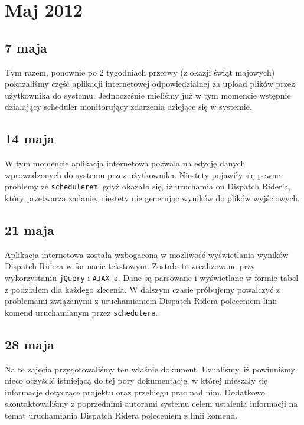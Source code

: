 \section{Maj 2012}
\subsection{7 maja}
Tym razem, ponownie po 2 tygodniach przerwy (z okazji świąt majowych) pokazaliśmy część aplikacji internetowej odpowiedzialnej za 
upload plików przez użytkownika do systemu. Jednocześnie mieliśmy już w tym momencie wstępnie działający scheduler monitorujący
zdarzenia dziejące się w systemie.

\subsection{14 maja}
W tym momencie aplikacja internetowa pozwala na edycję danych wprowadzonych do systemu przez użytkownika.
Niestety pojawiły się pewne problemy ze \texttt{schedulerem}, gdyż okazało się, iż uruchamia on
Dispatch Rider'a, który przetwarza zadanie, niestety nie generując wyników do plików wyjściowych.

\subsection{21 maja}
Aplikacja internetowa została wzbogacona w możliwość wyświetlania wyników Dispatch Ridera w formacie tekstowym.
Zostało to zrealizowane przy wykorzystaniu \texttt{jQuery} i  \texttt{AJAX-a}. Dane są parsowane i wyświetlane w formie tabel
z podziałem dla każdego zlecenia. W dalszym czasie próbujemy powalczyć z problemami związanymi z uruchamianiem Dispatch Ridera
poleceniem linii komend uruchamianym przez \texttt{schedulera}.

\subsection{28 maja}
Na te zajęcia przygotowaliśmy ten właśnie dokument. Uznaliśmy, iż powinniśmy nieco oczyścić istniejącą do tej pory dokumentację,
w której mieszały się informacje dotyczące projektu oraz przebiegu prac nad nim. Dodatkowo skontaktowaliśmy z poprzednimi
autorami systemu celem ustalenia informacji na temat uruchamiania Dispatch Ridera poleceniem z linii komend.
